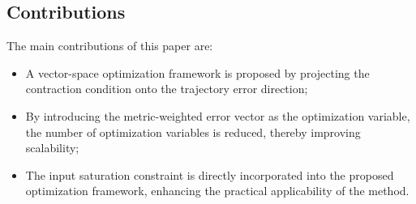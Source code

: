 \documentclass{ifacconf}
\begin{document}

\subsection{Contributions}

The main contributions of this paper are:
\begin{itemize}
   \item A vector-space optimization framework is proposed by projecting the contraction condition onto the trajectory error direction;
   \item By introducing the metric-weighted error vector as the optimization variable, the number of optimization variables is reduced, thereby improving scalability;
   \item The input saturation constraint is directly incorporated into the proposed optimization framework, enhancing the practical applicability of the method.

\end{itemize}
\end{document}
